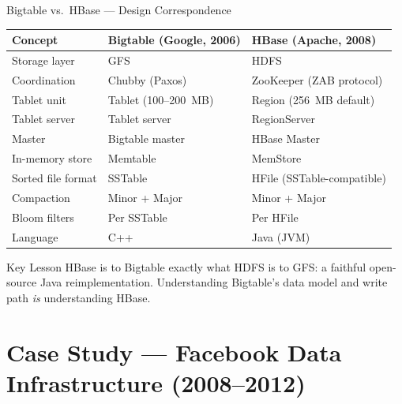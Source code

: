 \documentclass[aspectratio=169,10pt]{beamer}
\begin{document}
\begin{frame}{Bigtable vs.\ HBase — Design Correspondence}
  \begin{center}
  \renewcommand{\arraystretch}{1.3}
  \begin{tabular}{@{}lll@{}}
    \toprule
    \textbf{Concept} & \textbf{Bigtable (Google, 2006)} & \textbf{HBase (Apache, 2008)} \\
    \midrule
    Storage layer      & GFS                  & HDFS \\
    Coordination       & Chubby (Paxos)       & ZooKeeper (ZAB protocol) \\
    Tablet unit        & Tablet (100--200~MB) & Region (256~MB default) \\
    Tablet server      & Tablet server        & RegionServer \\
    Master             & Bigtable master      & HBase Master \\
    In-memory store    & Memtable             & MemStore \\
    Sorted file format & SSTable              & HFile (SSTable-compatible) \\
    Compaction         & Minor + Major        & Minor + Major \\
    Bloom filters      & Per SSTable          & Per HFile \\
    Language           & C++                  & Java (JVM) \\
    \bottomrule
  \end{tabular}
  \end{center}
  \vspace{4pt}
  \begin{alertblock}{Key Lesson}
    HBase is to Bigtable exactly what HDFS is to GFS: a faithful
    open-source Java reimplementation.  Understanding Bigtable's
    data model and write path \emph{is} understanding HBase.
  \end{alertblock}
\end{frame}

\section{Case Study — Facebook Data Infrastructure (2008--2012)}
\end{document}
